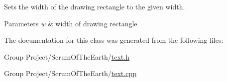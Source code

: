 Sets the width of the drawing rectangle to the given width. 


\begin{DoxyParams}{Parameters}
{\em w} & width of drawing rectangle \\
\hline
\end{DoxyParams}


The documentation for this class was generated from the following files\+:\begin{DoxyCompactItemize}
\item 
Group Project/\+Scrum\+Of\+The\+Earth/\hyperlink{text_8h}{text.\+h}\item 
Group Project/\+Scrum\+Of\+The\+Earth/\hyperlink{text_8cpp}{text.\+cpp}\end{DoxyCompactItemize}
